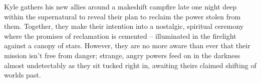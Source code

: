  Kyle gathers his new allies around a makeshift campfire late one night deep within the supernatural to reveal their plan to reclaim the power stolen from them. Together, they make their intention into a nostalgic, spiritual ceremony where the promises of reclamation is cemented -- illuminated in the firelight against a canopy of stars. However, they are no more aware than ever that their mission isn't free from danger; strange, angry powers feed on in the darkness almost undetectably as they sit tucked right in, awaiting theirs claimed shifting of worlds past.
